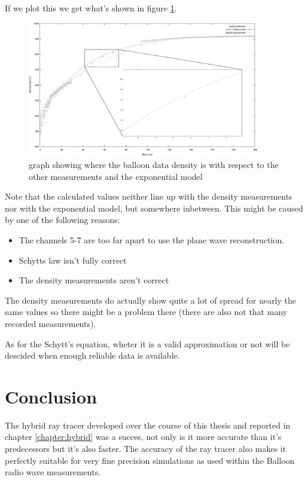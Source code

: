 \documentclass[11pt,a4paper,faculty=we,language=en,doctype=report]{cls/ugent-doc}
\begin{document}
If we plot this we get what's shown in figure
\ref{fig:BalloonDensity6And7}.
\begin{figure}
	\centering
	\includegraphics[width=0.9\textwidth]{DensityBalloonWithZoom.pdf}
	\caption{graph showing where the balloon data density is with
	respect to the other measurements and the exponential model}
	\label{fig:BalloonDensity6And7}
\end{figure}
Note that the calculated values neither line up with the density
measurements nor with the exponential model, but somewhere
inbetween. This might be caused by one of the following reasons:
\begin{itemize}
	\item The channels 5-7 are too far apart to use the plane
		wave reconstruction.
	\item Schytts law isn't fully correct
	\item The density measurements aren't correct
\end{itemize}
The density measurements do actually show quite a lot of spread for nearly
the same values so there might be a problem there (there are also not that many
recorded measurements).  

As for the Schytt's equation, wheter it is a valid approximation or not will be
descided when enough reliable data is available.  
\chapter*{Conclusion}
The hybrid ray tracer developed over the course of this thesis and reported in
chapter \ref{chapter:hybrid} was a succes, not only is it more accurate than
it's predecessors but it's also faster.  The accuracy of the ray tracer also
makes it perfectly suitable for very fine precision simulations as used within
the Balloon radio wave measurements.
\end{document}
